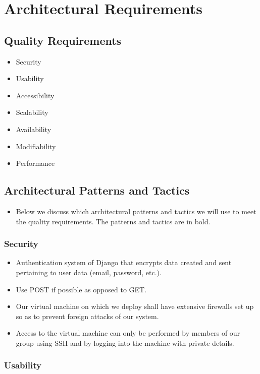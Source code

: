 \documentclass[12pt]{article}
\begin{document}
\newpage

\section{Architectural Requirements}

\subsection*{Quality Requirements}
\begin{itemize}
\item Security
\item Usability
\item Accessibility
\item Scalability
\item Availability
\item Modifiability
\item Performance
\end{itemize}

\subsection*{Architectural Patterns and Tactics}
\begin{itemize}
  \item Below we discuss which architectural patterns and tactics we will use to meet the quality requirements. The patterns and tactics are in bold.
\end{itemize}

\subsubsection*{Security}
\begin{itemize}
\item Authentication system of Django that encrypts data created and sent pertaining to user data (email, password, etc.).
\item Use POST if possible as opposed to GET.
\item Our virtual machine on which we deploy shall have extensive firewalls set up so as to prevent foreign attacks of our system.
\item Access to the virtual machine can only be performed by members of our group using SSH and by logging into the machine with private details.
\end{itemize}

\subsubsection*{Usability}
\end{document}
